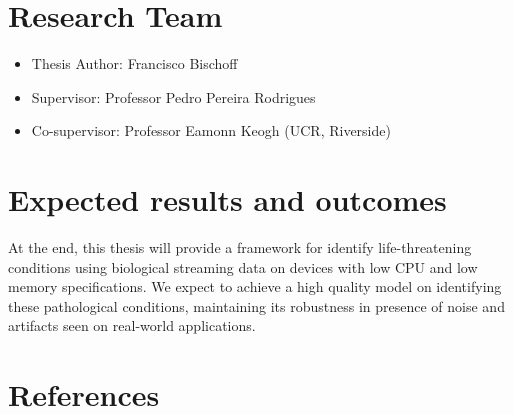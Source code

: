 \documentclass[runningheads]{llncs}
\providecommand{\tightlist}{%
  \setlength{\itemsep}{0pt}\setlength{\parskip}{0pt}}
\begin{document}
\hypertarget{research-team}{%
\section{Research Team}\label{research-team}}

\begin{itemize}
\tightlist
\item
  Thesis Author: Francisco Bischoff
\item
  Supervisor: Professor Pedro Pereira Rodrigues
\item
  Co-supervisor: Professor Eamonn Keogh (UCR, Riverside)
\end{itemize}

\hypertarget{expected-results-and-outcomes}{%
\section{Expected results and outcomes}\label{expected-results-and-outcomes}}

At the end, this thesis will provide a framework for identify life-threatening conditions using
biological streaming data on devices with low CPU and low memory specifications. We expect
to achieve a high quality model on identifying these pathological conditions, maintaining its
robustness in presence of noise and artifacts seen on real-world applications.

\hypertarget{references}{%
\section*{References}\label{references}}
\end{document}
